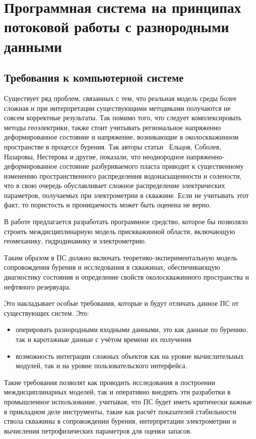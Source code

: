 \chapter{Программная система на принципах потоковой работы с разнородными данными} \label{chapt4}

\section{Требования к компьютерной системе} \label{sect4_1}

Существует ряд проблем, связанных с тем, что реальная модель среды более
сложная и при интерпретации существующими методиками получаются не совсем
корректные результаты. Так помимо того, что следует комплексировать методы
геоэлектрики, также стоит учитывать региональное напряженно деформированное
состояние и напряжение, возникающие в околоскважинном пространстве в
процессе бурения. Так авторы статьи~\cite{Yeltsov2014} Ельцов, Соболев,
Назаровы, Нестерова и другие, показали, что неоднородное
напряженно-деформированное состояние разбуриваемого пласта приводит к
существенному изменению пространственного распределения водонасыщенности и
солености, что в свою очередь обуславливает сложное распределение
электрических параметров, получаемых при электрометрии в скважине. Если не
учитывать этот факт, то пористость и проницаемость может быть оценена не
верно.

В работе предлагается разработать программное средство, которое бы
позволяло строить междисциплинарную модель прискважинной области,
включающую геомеханику, гидродинамику и электрометрию.

Таким образом в ПС должно включать теоретико-экспериментальную модель
сопровождения бурения и исследования в скважинах, обеспечивающую
диагностику состояния и определение свойств околоскважинного пространства и
нефтяного резервуара.

Это накладывает особые требования, которые и будут отличать данное ПС от
существующих систем. Это:
\begin{itemize}
\item оперировать разнородными входными данными, это как данные по бурению,
так и каротажные данные с учётом времени их получения
\item возможность интеграции сложных объектов как на уровне вычислительных
модулей, так и на уровне пользовательского интерфейса.
\end{itemize}

Такие требования позволят как проводить исследования в построении
междисциплинарных моделей, так и оперативно внедрять эти разработки в
промышленное использование, учитывая, что ПС будет иметь критически важные
в прикладном деле инструменты, такие как расчёт показателей стабильности
ствола скважины в сопровождении бурения, интерпретации электрометрии и
вычисления петрофизических параметров для оценки запасов.


